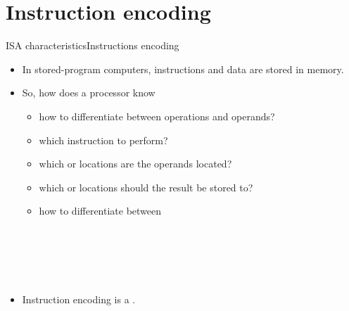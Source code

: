\section{Instruction encoding}
\begin{frame}{\acs{ISA} characteristics}{Instructions encoding}
  \begin{itemize}
      \item In stored-program computers, instructions and data are stored in memory.
    \item So, how does a processor know
    \begin{itemize}
        \item how to differentiate between operations and operands?
    	\item which instruction to perform?
    	\item which  or  locations are the operands located?
        \item which  or  locations should the result be stored to?
        \pauseprint
        \item how to differentiate between
	\end{itemize}
	~~~~~~\\
	~~~~~~\\
	~~~~~~\\
	~~~~~~\\
      \item Instruction encoding is a .
  \end{itemize}
\end{frame}

